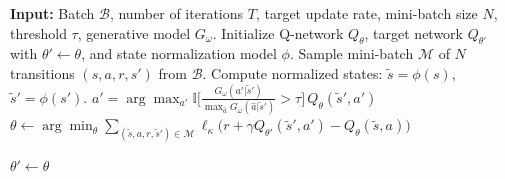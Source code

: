 \begin{algorithm}[t]
\caption{Modified DQN+BC with State Normalization}
\label{alg:bcq_normalized}
\begin{algorithmic}[1]
\STATE \textbf{Input:} Batch $\mathcal{B}$, number of iterations $T$, target update rate, mini-batch size $N$, threshold $\tau$, generative model $G_\omega$.
\STATE Initialize Q-network $Q_\theta$, target network $Q_{\theta'}$ with $\theta' \leftarrow \theta$, and state normalization model $\phi$.
    \STATE Sample mini-batch $\mathcal{M}$ of $N$ transitions $(s,a,r,s')$ from $\mathcal{B}$.
    \STATE Compute normalized states: $\tilde{s} = \phi(s)$, $\tilde{s}' = \phi(s')$.
    \STATE $a' = \arg\max_{a'} \mathbb{I}\!\Big[\frac{G_\omega(a'|\tilde{s}')}{\max_{\hat{a}} G_\omega(\hat{a}|\tilde{s}')} > \tau \Big] \, Q_\theta(\tilde{s}',a')$
    \STATE $\theta \leftarrow \arg\min_\theta \sum_{(\tilde{s},a,r,\tilde{s}') \in \mathcal{M}} \ell_\kappa \Big(r + \gamma Q_{\theta'}(\tilde{s}',a') - Q_\theta(\tilde{s},a)\Big)$

        \STATE $\theta' \leftarrow \theta$
    \ENDIF
\ENDFOR
\end{algorithmic}
\end{algorithm}